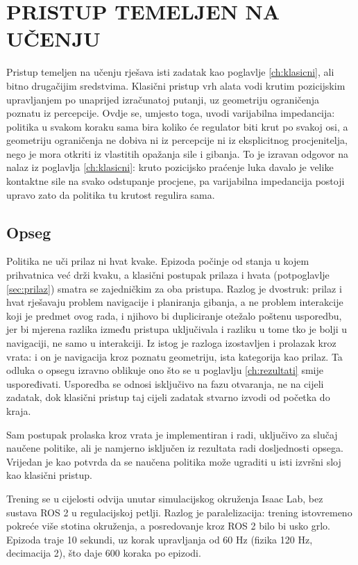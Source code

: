 \chapter{PRISTUP TEMELJEN NA UČENJU}
\label{ch:rl}

Pristup temeljen na učenju rješava isti zadatak kao poglavlje \ref{ch:klasicni}, ali bitno
drugačijim sredstvima. Klasični pristup vrh alata vodi krutim pozicijskim
upravljanjem po unaprijed izračunatoj putanji, uz geometriju ograničenja poznatu iz percepcije.
Ovdje se, umjesto toga, uvodi varijabilna impedancija: politika u svakom koraku sama bira koliko
će regulator biti krut po svakoj osi, a geometriju ograničenja ne dobiva ni iz percepcije ni iz
eksplicitnog procjenitelja, nego je mora otkriti iz vlastitih opažanja sile i gibanja. To je
izravan odgovor na nalaz iz poglavlja \ref{ch:klasicni}: kruto pozicijsko praćenje luka davalo je
velike kontaktne sile na svako odstupanje procjene, pa varijabilna impedancija postoji upravo
zato da politika tu krutost regulira sama.

\section{Opseg}
\label{sec:rl-opseg}

Politika ne uči prilaz ni hvat kvake. Epizoda počinje od stanja u kojem prihvatnica već drži
kvaku, a klasični postupak prilaza i hvata (potpoglavlje \ref{sec:prilaz}) smatra se zajedničkim
za oba pristupa. Razlog je dvostruk: prilaz i hvat rješavaju problem navigacije i planiranja
gibanja, a ne problem interakcije koji je predmet ovog rada, i njihovo bi dupliciranje otežalo
poštenu usporedbu, jer bi mjerena razlika između pristupa uključivala i razliku u tome tko je
bolji u navigaciji, ne samo u interakciji. Iz istog je razloga izostavljen i prolazak kroz vrata:
i on je navigacija kroz poznatu geometriju, ista kategorija kao prilaz. Ta odluka o opsegu izravno
oblikuje ono što se u poglavlju \ref{ch:rezultati} smije uspoređivati. Usporedba se odnosi
isključivo na fazu otvaranja, ne na cijeli zadatak, dok klasični pristup taj cijeli zadatak
stvarno izvodi od početka do kraja.

Sam postupak prolaska kroz vrata je implementiran i radi, uključivo za slučaj naučene politike,
ali je namjerno isključen iz rezultata radi dosljednosti opsega. Vrijedan je kao potvrda da se
naučena politika može ugraditi u isti izvršni sloj kao klasični pristup.

Trening se u cijelosti odvija unutar simulacijskog okruženja Isaac Lab, bez sustava ROS 2 u
regulacijskoj petlji. Razlog je paralelizacija: trening istovremeno pokreće više stotina
okruženja, a posredovanje kroz ROS 2 bilo bi usko grlo. Epizoda traje 10 sekundi, uz korak
upravljanja od 60 Hz (fizika 120 Hz, decimacija 2), što daje 600 koraka po epizodi.

